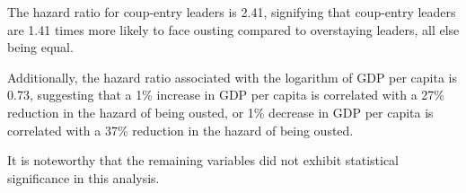 \documentclass[
  12pt,
  a4paper,
  12pt]{article}
\begin{document}
The hazard ratio for coup-entry leaders is 2.41, signifying that
coup-entry leaders are 1.41 times more likely to face ousting compared
to overstaying leaders, all else being equal.

Additionally, the hazard ratio associated with the logarithm of GDP per
capita is 0.73, suggesting that a 1\% increase in GDP per capita is
correlated with a 27\% reduction in the hazard of being ousted, or 1\%
decrease in GDP per capita is correlated with a 37\% reduction in the
hazard of being ousted.

It is noteworthy that the remaining variables did not exhibit
statistical significance in this analysis.

\begin{figure}

\begin{minipage}{0.50\linewidth}



\end{minipage}%
%
\begin{minipage}{0.50\linewidth}

\end{minipage}
\end{figure}
\end{document}

